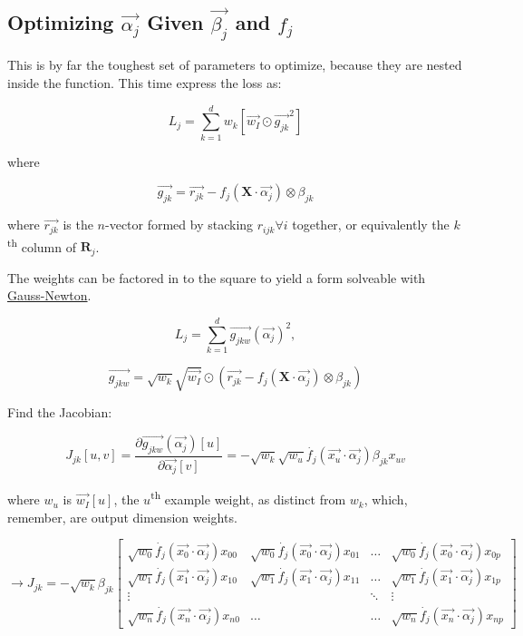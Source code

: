 \documentclass[12pt]{article}
\begin{document}
\subsection{Optimizing $\vec{\alpha_j}$ Given $\vec{\beta_j}$ and $f_j$}

This is by far the toughest set of parameters to optimize, because they are nested inside the function. This time express the loss as:

$$L_j = \sum_{k=1}^d w_k [\vec{w_I} \odot \vec{g_{jk}}^2]$$

where

$$ \vec{g_{jk}} = \vec{r_{jk}} - f_j(\pmb{X} \cdot \vec{\alpha_j}) \otimes \beta_{jk}$$

where $\vec{r_{jk}}$ is the $n$-vector formed by stacking $r_{ijk} \forall i$ together, or equivalently the $k$\textsuperscript{th} column of $\pmb{R}_j$.

The weights can be factored in to the square to yield a form solveable with \href{https://en.wikipedia.org/wiki/Gauss%E2%80%93Newton_algorithm#Description}{Gauss-Newton}.

$$L_j = \sum_{k=1}^d \vec{g_{jkw}}(\vec{\alpha_j})^2,$$

$$\vec{g_{jkw}} = \sqrt{w_k} \sqrt{\vec{w_I}} \odot (\vec{r_{jk}} - f_j(\pmb{X} \cdot \vec{\alpha_j}) \otimes \beta_{jk})$$

Find the Jacobian:

$$J_{jk}[u,v] = \frac{\partial \vec{g_{jkw}}(\vec{\alpha_j})[u]}{\partial \vec{\alpha_j}[v]} = -\sqrt{w_k} \sqrt{w_u} \dot{f_j}(\vec{x_u} \cdot \vec{\alpha_j}) \beta_{jk} x_{uv}$$

where $w_u$ is $\vec{w_I}[u]$, the $u$\textsuperscript{th} example weight, as distinct from $w_k$, which, remember, are output dimension weights.

\[
\rightarrow J_{jk} = -\sqrt{w_k} \beta_{jk}
\begin{bmatrix}
	\sqrt{w_0} \dot{f_j}(\vec{x_0} \cdot \vec{\alpha_j}) x_{00} & \sqrt{w_0} \dot{f_j}(\vec{x_0} \cdot \vec{\alpha_j}) x_{01} & \dots & \sqrt{w_0} \dot{f_j}(\vec{x_0} \cdot \vec{\alpha_j}) x_{0p} \\
    \sqrt{w_1} \dot{f_j}(\vec{x_1} \cdot \vec{\alpha_j}) x_{10} & \sqrt{w_1} \dot{f_j}(\vec{x_1} \cdot \vec{\alpha_j}) x_{11} & \dots & \sqrt{w_1} \dot{f_j}(\vec{x_1} \cdot \vec{\alpha_j}) x_{1p}\\
    \vdots & & \ddots & \vdots\\
    \sqrt{w_n} \dot{f_j}(\vec{x_n} \cdot \vec{\alpha_j}) x_{n0} & \hdots & \hdots & \sqrt{w_n} \dot{f_j}(\vec{x_n} \cdot \vec{\alpha_j}) x_{np}
\end{bmatrix}
\]
\end{document}
